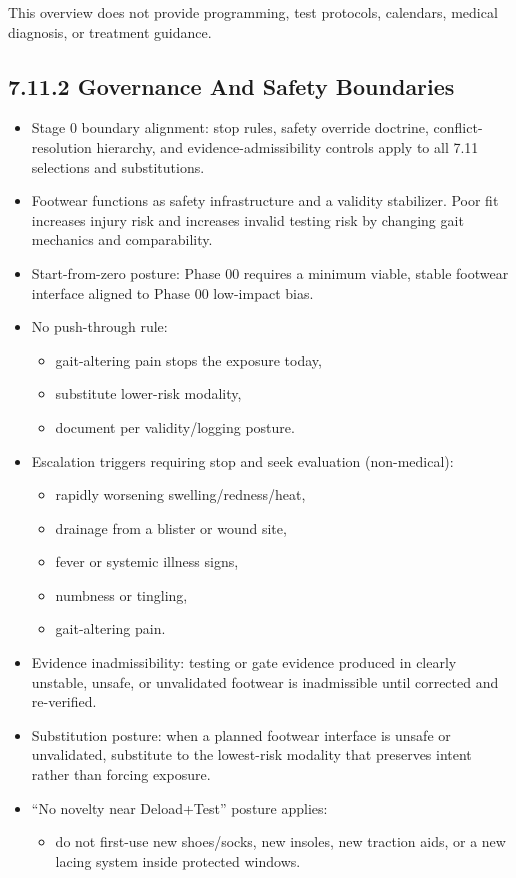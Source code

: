 \documentclass[10pt]{article}
\begin{document}
This overview does not provide programming, test protocols, calendars, medical diagnosis, or treatment guidance.

\subsection*{7.11.2 Governance And Safety Boundaries}
{}

\begin{itemize}
\item Stage 0 boundary alignment: stop rules, safety override doctrine, conflict-resolution hierarchy, and evidence-admissibility controls apply to all 7.11 selections and substitutions.
\item Footwear functions as safety infrastructure and a validity stabilizer. Poor fit increases injury risk and increases invalid testing risk by changing gait mechanics and comparability.
\item Start-from-zero posture: Phase 00 requires a minimum viable, stable footwear interface aligned to Phase 00 low-impact bias.
\item No push-through rule:
  \begin{itemize}
  \item gait-altering pain stops the exposure today,
  \item substitute lower-risk modality,
  \item document per validity/logging posture.
  \end{itemize}
\item Escalation triggers requiring stop and seek evaluation (non-medical):
  \begin{itemize}
  \item rapidly worsening swelling/redness/heat,
  \item drainage from a blister or wound site,
  \item fever or systemic illness signs,
  \item numbness or tingling,
  \item gait-altering pain.
  \end{itemize}
\item Evidence inadmissibility: testing or gate evidence produced in clearly unstable, unsafe, or unvalidated footwear is inadmissible until corrected and re-verified.
\item Substitution posture: when a planned footwear interface is unsafe or unvalidated, substitute to the lowest-risk modality that preserves intent rather than forcing exposure.
\item “No novelty near Deload+Test” posture applies:
  \begin{itemize}
  \item do not first-use new shoes/socks, new insoles, new traction aids, or a new lacing system inside protected windows.
  \end{itemize}
\end{itemize}
\end{document}
